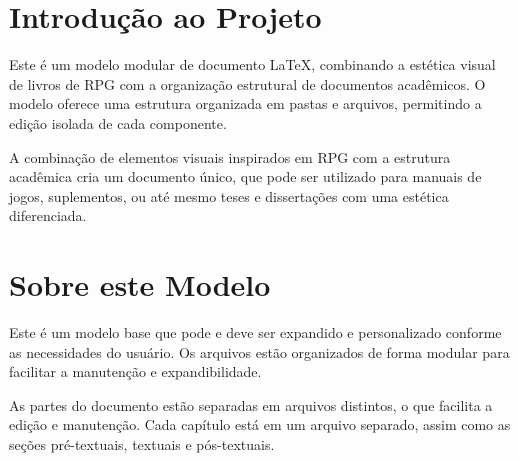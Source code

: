 
\cleardoublepage
\chapter*{Introdução ao Projeto}

Este é um modelo modular de documento LaTeX, combinando a estética visual de livros de RPG com a organização estrutural de documentos acadêmicos. O modelo oferece uma estrutura organizada em pastas e arquivos, permitindo a edição isolada de cada componente.

\begin{quotebox}
A combinação de elementos visuais inspirados em RPG com a estrutura acadêmica cria um documento único, que pode ser utilizado para manuais de jogos, suplementos, ou até mesmo teses e dissertações com uma estética diferenciada.
\end{quotebox}

\cleardoublepage
\chapter*{Sobre este Modelo}

\begin{dmnote}
Este é um modelo base que pode e deve ser expandido e personalizado conforme as necessidades do usuário. Os arquivos estão organizados de forma modular para facilitar a manutenção e expandibilidade.
\end{dmnote}

\begin{highlight}
As partes do documento estão separadas em arquivos distintos, o que facilita a edição e manutenção. Cada capítulo está em um arquivo separado, assim como as seções pré-textuais, textuais e pós-textuais.
\end{highlight}

